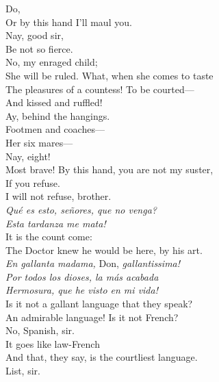 \documentclass[a4paper,oneside,12pt]{memoir}
\begin{document}
\begin{drama*}
\kastrilspeaks {} Do,\\
Or by this hand I'll maul you.\\
\facespeaks {} Nay, good sir,\\
Be not so fierce.\\
\subtlespeaks {} No, my enraged child;\\
She will be ruled. What, when she comes to taste\\
The pleasures of a countess! To be courted---\\
\facespeaks And kissed and ruffled!\\
\subtlespeaks {} Ay, behind the hangings.\\
\facespeaks Footmen and coaches---\\
\subtlespeaks {} Her six mares---\\
\facespeaks {} Nay, eight!\\
\kastrilspeaks Most brave! By this hand, you are not my suster,\\
If you refuse.\\
\pliantspeaks {} I will not refuse, brother.\\
\surlyspeaks \emph{Qu\'{e} es esto, se\~{n}ores, que no venga?\\
Esta tardanza me mata!}\\
\facespeaks {} It is the count come:\\
The Doctor knew he would be here, by his art.\\
\subtlespeaks \emph{En gallanta madama,} Don, \emph{gallantissima!}\\
\surlyspeaks \emph{Por todos los dioses, la m\'{a}s acabada\\
Hermosura, que he visto en mi vida!}\\
\facespeaks Is it not a gallant language that they speak?\\
\kastrilspeaks An admirable language! Is it not French?\\
\facespeaks No, Spanish, sir.\\
\kastrilspeaks {} It goes like law-French\\
And that, they say, is the courtliest language.\\
\facespeaks {} List, sir.\\

\end{drama*}
\end{document}
